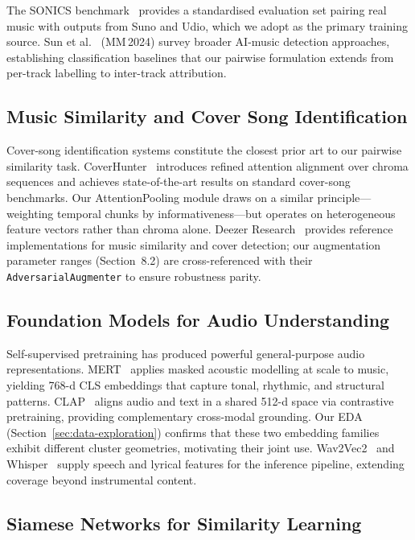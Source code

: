\documentclass[11pt,a4paper]{article}
\begin{document}
The SONICS benchmark~\cite{E1} provides a standardised evaluation set pairing real music with outputs from Suno and Udio, which we adopt as the primary training source. Sun et al.~\cite{E2} (MM\,2024) survey broader AI-music detection approaches, establishing classification baselines that our pairwise formulation extends from per-track labelling to inter-track attribution.

\subsection{Music Similarity and Cover Song Identification}

Cover-song identification systems constitute the closest prior art to our pairwise similarity task. CoverHunter~\cite{C1} introduces refined attention alignment over chroma sequences and achieves state-of-the-art results on standard cover-song benchmarks. Our AttentionPooling module draws on a similar principle---weighting temporal chunks by informativeness---but operates on heterogeneous feature vectors rather than chroma alone. Deezer Research~\cite{B3} provides reference implementations for music similarity and cover detection; our augmentation parameter ranges (Section~8.2) are cross-referenced with their \texttt{AdversarialAugmenter} to ensure robustness parity.

\subsection{Foundation Models for Audio Understanding}

Self-supervised pretraining has produced powerful general-purpose audio representations. MERT~\cite{A2} applies masked acoustic modelling at scale to music, yielding 768-d CLS embeddings that capture tonal, rhythmic, and structural patterns. CLAP~\cite{A3} aligns audio and text in a shared 512-d space via contrastive pretraining, providing complementary cross-modal grounding. Our EDA (Section~\ref{sec:data-exploration}) confirms that these two embedding families exhibit different cluster geometries, motivating their joint use. Wav2Vec2~\cite{A6} and Whisper~\cite{A7} supply speech and lyrical features for the inference pipeline, extending coverage beyond instrumental content.

\subsection{Siamese Networks for Similarity Learning}
\end{document}
